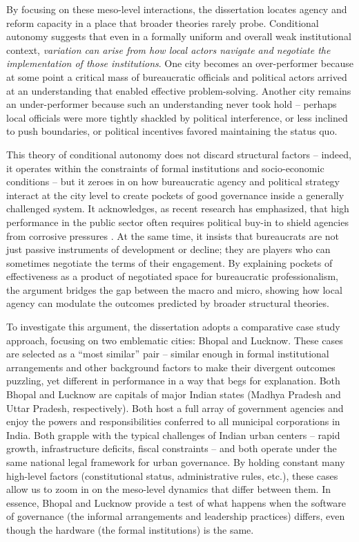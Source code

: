 By focusing on these meso-level interactions, the dissertation locates agency and reform capacity in a place that broader theories rarely probe. Conditional autonomy suggests that even in a formally uniform and overall weak institutional context, \textit{variation can arise from how local actors navigate and negotiate the implementation of those institutions}. One city becomes an over-performer because at some point a critical mass of bureaucratic officials and political actors arrived at an understanding that enabled effective problem-solving. Another city remains an under-performer because such an understanding never took hold – perhaps local officials were more tightly shackled by political interference, or less inclined to push boundaries, or political incentives favored maintaining the status quo. 

This theory of conditional autonomy does not discard structural factors – indeed, it operates within the constraints of formal institutions and socio-economic conditions – but it zeroes in on how bureaucratic agency and political strategy interact at the city level to create pockets of good governance inside a generally challenged system. It acknowledges, as recent research has emphasized, that high performance in the public sector often requires political buy-in to shield agencies from corrosive pressures \citep{klitgaard_high-performance_2005}. At the same time, it insists that bureaucrats are not just passive instruments of development or decline; they are players who can sometimes negotiate the terms of their engagement. By explaining pockets of effectiveness as a product of negotiated space for bureaucratic professionalism, the argument bridges the gap between the macro and micro, showing how local agency can modulate the outcomes predicted by broader structural theories.

To investigate this argument, the dissertation adopts a comparative case study approach, focusing on two emblematic cities: Bhopal and Lucknow. These cases are selected as a “most similar” pair – similar enough in formal institutional arrangements and other background factors to make their divergent outcomes puzzling, yet different in performance in a way that begs for explanation. Both Bhopal and Lucknow are capitals of major Indian states (Madhya Pradesh and Uttar Pradesh, respectively). Both host a full array of government agencies and enjoy the powers and responsibilities conferred to all municipal corporations in India. Both grapple with the typical challenges of Indian urban centers – rapid growth, infrastructure deficits, fiscal constraints – and both operate under the same national legal framework for urban governance. By holding constant many high-level factors (constitutional status, administrative rules, etc.), these cases allow us to zoom in on the meso-level dynamics that differ between them. In essence, Bhopal and Lucknow provide a test of what happens when the software of governance (the informal arrangements and leadership practices) differs, even though the hardware (the formal institutions) is the same.

